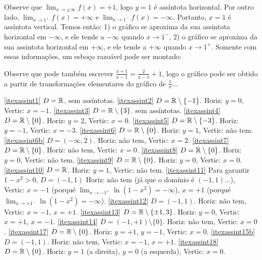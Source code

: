 \begin{Solution}{4.23}
Observe que $\lim_{x\to \pm\infty}f(x)=+1$, logo $y=1$ é assíntota
horizontal.
Por outro lado, $\lim_{x\to 1^+}f(x)=+\infty$ e $\lim_{x\to 1^-}f(x)
=-\infty$. Portanto, $x=1$ é assíntota vertical.
Temos então: 1) o gráfico se aproxima da sua assintota horizontal em
$-\infty$, e ele tende a $-\infty$ quando $x\to 1^-$,
2) o gráfico se aproxima da sua assintota horizontal em $+\infty$, e
ele tende a $+\infty$ quando $x\to 1^+$.
Somente com essas informações, um esboço razoável pode ser montado:
\begin{center}
\begin{bmlimage}\end{bmlimage}
\end{center}
Observe que pode também escrever $\frac{x+1}{x-1}=\frac{2}{x-1}+1$,
logo o gráfico pode ser obtido a partir de transformações elementares
do gráfico de $\frac1x$...
\end{Solution}
\begin{Solution}{4.24}
\eqref{itexassint1} $D=\mathbb{R}$, sem assíntotas.
\eqref{itexassint2} $D=\mathbb{R}\setminus\{-1\}$. Horiz: $y=0$, Vertic: $x=-1$.
\eqref{itexassint3} $D=\mathbb{R}\setminus\{3\}$. sem assíntotas.
\eqref{itexassint4} $D=\mathbb{R}\setminus\{0\}$. Horiz: $y=2$, Vertic: $x=0$.
\eqref{itexassint5} $D=\mathbb{R}\setminus\{-3\}$. Horiz: $y=-1$, Vertic: $x=-3$.
\eqref{itexassint6} $D=\mathbb{R}\setminus\{0\}$. Horiz: $y=1$, Vertic: não tem.
\eqref{itexassint6b} $D=(-\infty,2)$. Horiz: não tem, Vertic: $x=2$.
\eqref{itexassint7} $D=\mathbb{R}\setminus\{0\}$. Horiz: não tem, Vertic: $x=0$.
\eqref{itexassint8} $D=\mathbb{R}\setminus\{0\}$. Horiz: $y=0$, Vertic: não tem.
\eqref{itexassint9} $D=\mathbb{R}\setminus\{0\}$. Horiz: $y=0$, Vertic: $x=0$.
\eqref{itexassint10} $D=\mathbb{R}$. Horiz: $y=1$, Vertic: não tem.
\eqref{itexassint11} Para garantir $1-x^2>0$, $D=(-1,1)$ Horiz: não
tem (já que o domínio é $(-1,1)$...), Vertic: $x=-1$ (porqué
$\lim_{x\to -1^+}\ln (1-x^2)=-\infty$), $x=+1$ (porqué $\lim_{x\to
+1^-}\ln (1-x^2)=-\infty$).
\eqref{itexassint12} $D=(-1,1)$. Horiz: não tem, Vertic: $x=-1$, $x=+1$.
\eqref{itexassint13} $D=\mathbb{R}\setminus\{\pm 1, 3\}$. Horiz: $y=0$,
Vertic: $x=+1$, $x=-1$.
\eqref{itexassint14} $D=(-1,+1)\setminus\{ 0\}$. Horiz: não tem,
Vertic: $x=0$.
\eqref{itexassint17} $D=\mathbb{R}\setminus\{0\}$. Horiz: $y=+1$, $y=-1$,
Vertic: $x=0$.
\eqref{itexassint15b} $D=(-1,1)$. Horiz: não tem, Vertic: $x=-1$, $x=+1$.
\eqref{itexassint18} $D=\mathbb{R}\setminus\{0\}$. Horiz: $y=1$ (a direita), $y=0$ (a esquerda),
Vertic: $x=0$.
\end{Solution}

